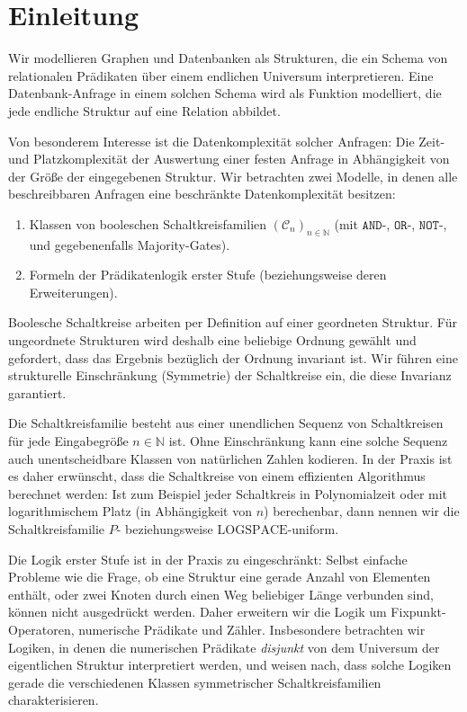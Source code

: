 
\chapter{Einleitung}

Wir modellieren Graphen und Datenbanken als Strukturen, die ein Schema
von relationalen Prädikaten über einem endlichen Universum interpretieren.
Eine Datenbank-Anfrage in einem solchen Schema wird als Funktion modelliert,
die jede endliche Struktur auf eine Relation abbildet.

Von besonderem Interesse ist die Datenkomplexität solcher Anfragen:
Die Zeit- und Platzkomplexität der Auswertung einer festen Anfrage
in Abhängigkeit von der Größe der eingegebenen Struktur. Wir betrachten
zwei Modelle, in denen alle beschreibbaren Anfragen eine beschränkte
Datenkomplexität besitzen:
\begin{enumerate}
\item Klassen von booleschen Schaltkreisfamilien $\left(\mathcal{C}_{n}\right)_{n\in\mathbb{N}}$
(mit $\mathtt{AND}$-, $\mathtt{OR}$-, $\mathtt{NOT}$-, und gegebenenfalls
Majority-Gates).
\item Formeln der Prädikatenlogik erster Stufe (beziehungsweise deren Erweiterungen).
\end{enumerate}
Boolesche Schaltkreise arbeiten per Definition auf einer geordneten
Struktur. Für ungeordnete Strukturen wird deshalb eine beliebige Ordnung
gewählt und gefordert, dass das Ergebnis bezüglich der Ordnung invariant
ist. Wir führen eine strukturelle Einschränkung (Symmetrie) der Schaltkreise
ein, die diese Invarianz garantiert.

Die Schaltkreisfamilie besteht aus einer unendlichen Sequenz von Schaltkreisen
für jede Eingabegröße $n\in\mathbb{N}$ ist. Ohne Einschränkung kann
eine solche Sequenz auch unentscheidbare Klassen von natürlichen Zahlen
kodieren. In der Praxis ist es daher erwünscht, dass die Schaltkreise
von einem effizienten Algorithmus berechnet werden: Ist zum Beispiel
jeder Schaltkreis in Polynomialzeit oder mit logarithmischem Platz
(in Abhängigkeit von $n$) berechenbar, dann nennen wir die Schaltkreisfamilie
$P$- beziehungsweise $\mathrm{LOGSPACE}$-uniform.

Die Logik erster Stufe ist in der Praxis zu eingeschränkt: Selbst
einfache Probleme wie die Frage, ob eine Struktur eine gerade Anzahl
von Elementen enthält, oder zwei Knoten durch einen Weg beliebiger
Länge verbunden sind, können nicht ausgedrückt werden.\cite{Libkin2012}
Daher erweitern wir die Logik um Fixpunkt-Operatoren, numerische Prädikate
und Zähler. Insbesondere betrachten wir Logiken, in denen die numerischen
Prädikate \emph{disjunkt} von dem Universum der eigentlichen Struktur
interpretiert werden, und weisen nach, dass solche Logiken gerade
die verschiedenen Klassen symmetrischer Schaltkreisfamilien charakterisieren.

